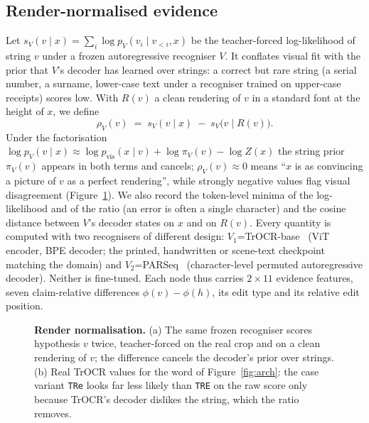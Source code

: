 \subsection{Render-normalised evidence}
\label{sec:evidence}
Let $s_V(v\mid x)=\sum_i\log p_V(v_i\mid v_{<i},x)$ be the teacher-forced log-likelihood of string $v$ under a frozen
autoregressive recogniser $V$. It conflates visual fit with the prior that $V$'s decoder has learned over strings: a
correct but rare string (a serial number, a surname, lower-case text under a recogniser trained on upper-case
receipts) scores low. With $R(v)$ a clean rendering of $v$ in a standard font at the height of $x$, we define
\begin{equation}
\rho_V(v)\;=\;s_V(v\mid x)\;-\;s_V\big(v\mid R(v)\big).
\label{eq:rho}
\end{equation}
Under the factorisation $\log p_V(v\mid x)\approx\log p_{\mathrm{vis}}(x\mid v)+\log\pi_V(v)-\log Z(x)$ the string
prior $\pi_V(v)$ appears in both terms and cancels; $\rho_V(v)\approx0$ means ``$x$ is as convincing a picture of $v$
as a perfect rendering'', while strongly negative values flag visual disagreement (Figure~\ref{fig:render}). We also
record the token-level minima of the log-likelihood and of the ratio (an error is often a single character) and the
cosine distance between $V$'s decoder states on $x$ and on $R(v)$. Every quantity is computed with two recognisers of
different design: $V_1$=TrOCR-base~\cite{li2023trocr} (ViT encoder, BPE decoder; the printed, handwritten or
scene-text checkpoint matching the domain) and $V_2$=PARSeq~\cite{bautista2022parseq} (character-level permuted
autoregressive decoder). Neither is fine-tuned. Each node thus carries $2\times11$ evidence features, seven
claim-relative differences $\phi(v)-\phi(h)$, its edit type and its relative edit position.

\begin{figure}[t]
\centering
\resizebox{0.9\linewidth}{!}{}
\caption{\textbf{Render normalisation.} (a) The same frozen recogniser scores hypothesis $v$ twice, teacher-forced on
the real crop and on a clean rendering of $v$; the difference cancels the decoder's prior over strings. (b) Real
TrOCR values for the word of Figure~\ref{fig:arch}: the case variant \texttt{TRe} looks far less likely than
\texttt{TRE} on the raw score only because TrOCR's decoder dislikes the string, which the ratio removes.}
\label{fig:render}
\end{figure}

